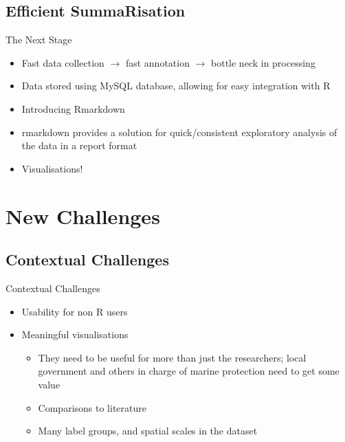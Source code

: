 \documentclass{beamer}
\begin{document}
        \subsection{Efficient SummaRisation}
            \begin{frame}{The Next Stage}
                \begin{itemize}
                  \item Fast data collection $\rightarrow$ fast annotation $\rightarrow$ bottle neck in processing
                  \item Data stored using MySQL database, allowing for easy integration with R \cite{R, RMySQL}
                  \item Introducing Rmarkdown \cite{rmarkdown}
                  \item rmarkdown provides a solution for quick/consistent exploratory analysis of the data in a report format
                  \item Visualisations! \cite{ggplot2}
                \end{itemize}
            \end{frame}


      \section{New Challenges}
        \subsection{Contextual Challenges}
            \begin{frame}{Contextual Challenges}
                \begin{itemize}
                    \item Usability for non R users
                    \item Meaningful visualisations
                    \begin{itemize}
                       \item They need to be useful for more than just the researchers; local government and others in charge of marine protection need to get some value
                       \item Comparisons to literature
                       \item Many label groups, and spatial scales in the dataset
                    \end{itemize}
                \end{itemize}
              \end{frame}
\end{document}
